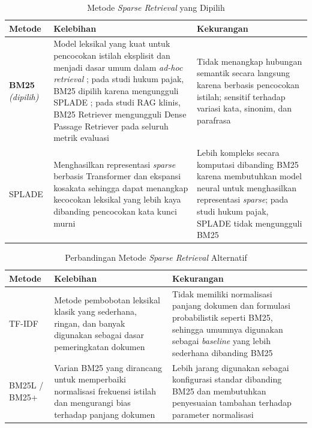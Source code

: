 \begin{table}[H]
\centering
\small
\caption{Metode \textit{Sparse Retrieval} yang Dipilih}
\label{tab:perbandingan_sparse}
\begin{tabular}{|p{2.4cm}|p{5.3cm}|p{5.3cm}|}
\hline
\textbf{Metode} & \textbf{Kelebihan} & \textbf{Kekurangan} \\
\hline
\textbf{BM25} \newline \textit{(dipilih)} &
Model leksikal yang kuat untuk pencocokan istilah eksplisit dan menjadi dasar umum dalam \textit{ad-hoc retrieval} \cite{robertson2009probabilistic}; pada studi hukum pajak, BM25 dipilih karena mengungguli SPLADE \cite{rustamov2025tax}; pada studi RAG klinis, BM25 Retriever mengungguli Dense Passage Retriever pada seluruh metrik evaluasi \cite{hiremath2025ragclin} &
Tidak menangkap hubungan semantik secara langsung karena berbasis pencocokan istilah; sensitif terhadap variasi kata, sinonim, dan parafrasa \\
\hline
SPLADE &
Menghasilkan representasi \textit{sparse} berbasis Transformer dan ekspansi kosakata sehingga dapat menangkap kecocokan leksikal yang lebih kaya dibanding pencocokan kata kunci murni \cite{formal2021splade} &
Lebih kompleks secara komputasi dibanding BM25 karena membutuhkan model neural untuk menghasilkan representasi \textit{sparse}; pada studi hukum pajak, SPLADE tidak mengungguli BM25 \cite{rustamov2025tax} \\
\hline
\end{tabular}
\end{table}

\begin{table}[H]
\centering
\small
\caption{Perbandingan Metode \textit{Sparse Retrieval} Alternatif}
\label{tab:perbandingan_sparse_lanjutan}
\begin{tabular}{|p{2.4cm}|p{5.3cm}|p{5.3cm}|}
\hline
\textbf{Metode} & \textbf{Kelebihan} & \textbf{Kekurangan} \\
\hline
TF-IDF &
Metode pembobotan leksikal klasik yang sederhana, ringan, dan banyak digunakan sebagai dasar pemeringkatan dokumen \cite{salton1988term} &
Tidak memiliki normalisasi panjang dokumen dan formulasi probabilistik seperti BM25, sehingga umumnya digunakan sebagai \textit{baseline} yang lebih sederhana dibanding BM25 \cite{robertson2009probabilistic} \\
\hline
BM25L / BM25+ &
Varian BM25 yang dirancang untuk memperbaiki normalisasi frekuensi istilah dan mengurangi bias terhadap panjang dokumen \cite{lv2011lowerbound} &
Lebih jarang digunakan sebagai konfigurasi standar dibanding BM25 dan membutuhkan penyesuaian tambahan terhadap parameter normalisasi \cite{lv2011lowerbound} \\
\hline
\end{tabular}
\end{table}

